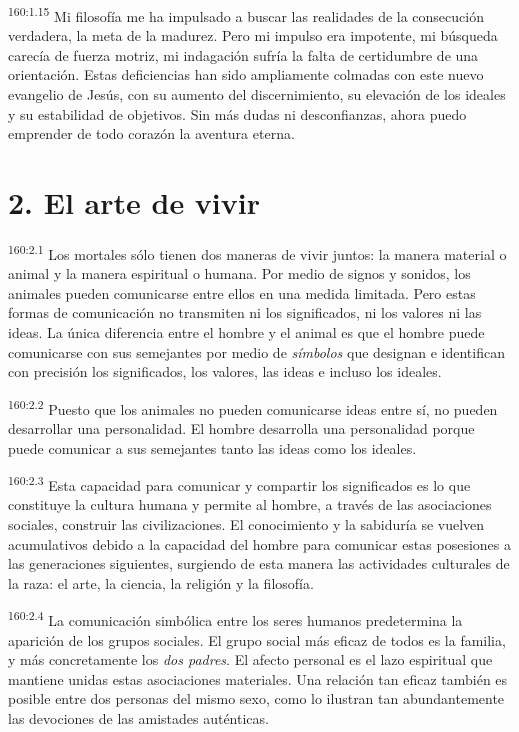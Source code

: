 \par
\textsuperscript{160:1.15} Mi filosofía me ha impulsado a buscar las realidades de la consecución verdadera, la meta de la madurez. Pero mi impulso era impotente, mi búsqueda carecía de fuerza motriz, mi indagación sufría la falta de certidumbre de una orientación. Estas deficiencias han sido ampliamente colmadas con este nuevo evangelio de Jesús, con su aumento del discernimiento, su elevación de los ideales y su estabilidad de objetivos. Sin más dudas ni desconfianzas, ahora puedo emprender de todo corazón la aventura eterna.

\section*{2. El arte de vivir}
\par
\textsuperscript{160:2.1} Los mortales sólo tienen dos maneras de vivir juntos: la manera material o animal y la manera espiritual o humana. Por medio de signos y sonidos, los animales pueden comunicarse entre ellos en una medida limitada. Pero estas formas de comunicación no transmiten ni los significados, ni los valores ni las ideas. La única diferencia entre el hombre y el animal es que el hombre puede comunicarse con sus semejantes por medio de \textit{símbolos} que designan e identifican con precisión los significados, los valores, las ideas e incluso los ideales.

\par
\textsuperscript{160:2.2} Puesto que los animales no pueden comunicarse ideas entre sí, no pueden desarrollar una personalidad. El hombre desarrolla una personalidad porque puede comunicar a sus semejantes tanto las ideas como los ideales.

\par
\textsuperscript{160:2.3} Esta capacidad para comunicar y compartir los significados es lo que constituye la cultura humana y permite al hombre, a través de las asociaciones sociales, construir las civilizaciones. El conocimiento y la sabiduría se vuelven acumulativos debido a la capacidad del hombre para comunicar estas posesiones a las generaciones siguientes, surgiendo de esta manera las actividades culturales de la raza: el arte, la ciencia, la religión y la filosofía.

\par
\textsuperscript{160:2.4} La comunicación simbólica entre los seres humanos predetermina la aparición de los grupos sociales. El grupo social más eficaz de todos es la familia, y más concretamente los \textit{dos padres}. El afecto personal es el lazo espiritual que mantiene unidas estas asociaciones materiales. Una relación tan eficaz también es posible entre dos personas del mismo sexo, como lo ilustran tan abundantemente las devociones de las amistades auténticas.

